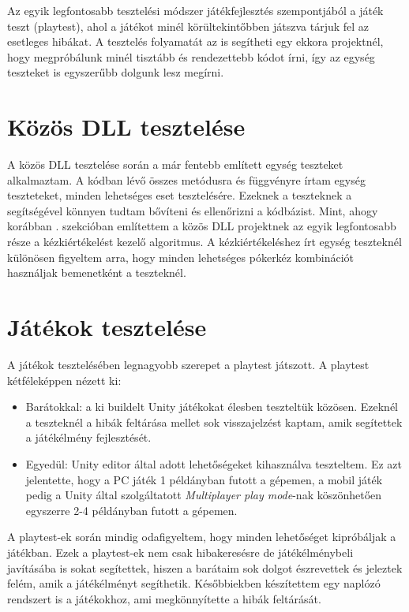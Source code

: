 \documentclass[]{thesis-ekf}
\theoremstyle{definition}
\theoremstyle{remark}
\begin{document}
Az egyik legfontosabb tesztelési módszer játékfejlesztés szempontjából a játék teszt (playtest), ahol a játékot minél körültekintőbben játszva tárjuk fel az esetleges hibákat. A tesztelés folyamatát az is segítheti egy ekkora projektnél, hogy megpróbálunk minél tisztább és rendezettebb kódot írni, így az egység teszteket is egyszerűbb dolgunk lesz megírni.

\section{Közös DLL tesztelése}

A közös DLL tesztelése során a már fentebb említett egység teszteket alkalmaztam. A kódban lévő összes metódusra és függvényre írtam egység teszteteket, minden lehetséges eset tesztelésére. Ezeknek a teszteknek a segítségével könnyen tudtam bővíteni és ellenőrizni a kódbázist. Mint, ahogy korábban . szekcióban említettem a közös DLL projektnek az egyik legfontosabb része a kézkiértékelést kezelő algoritmus. A kézkiértékeléshez írt egység teszteknél különösen figyeltem arra, hogy minden lehetséges pókerkéz kombinációt használjak bemenetként a teszteknél.

\section{Játékok tesztelése}

A játékok tesztelésében legnagyobb szerepet a playtest játszott. A playtest kétféleképpen nézett ki:

\begin{itemize}
	\item Barátokkal: a ki buildelt Unity játékokat élesben teszteltük közösen. Ezeknél a teszteknél a hibák feltárása mellet sok visszajelzést kaptam, amik segítettek a játékélmény fejlesztését.
	\item Egyedül: Unity editor által adott lehetőségeket kihasználva teszteltem. Ez azt jelentette, hogy a PC játék 1 példányban futott a gépemen, a mobil játék pedig a Unity által szolgáltatott \emph{Multiplayer play mode}-nak köszönhetően egyszerre 2-4 példányban futott a gépemen. \cite{UnityMultiplayerPlayMode}
\end{itemize}

A playtest-ek során mindig odafigyeltem, hogy minden lehetőséget kipróbáljak a játékban. Ezek a playtest-ek nem csak hibakeresésre de játékélménybeli javításába is sokat segítettek, hiszen a barátaim sok dolgot észrevettek és jeleztek felém, amik a játékélményt segíthetik. Későbbiekben készítettem egy naplózó rendszert is a játékokhoz, ami megkönnyítette a hibák feltárását.
\end{document}
